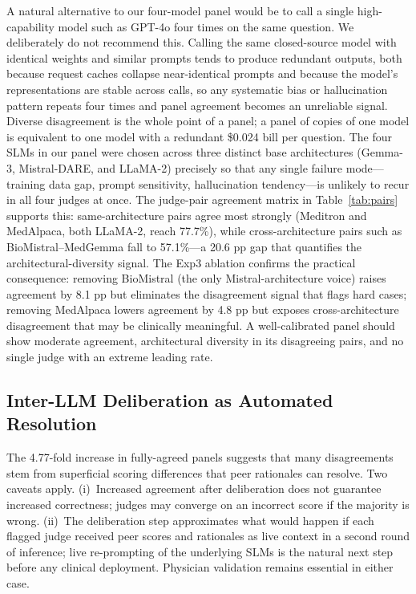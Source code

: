 \documentclass[conference]{IEEEtran}
\begin{document}
A natural alternative to our four-model panel would be to call a
single high-capability model such as GPT-4o four times on the same
question. We deliberately do not recommend this. Calling the same
closed-source model with identical weights and similar prompts tends
to produce redundant outputs, both because request caches collapse
near-identical prompts and because the model's representations are
stable across calls, so any systematic bias or hallucination pattern
repeats four times and panel agreement becomes an unreliable signal.
Diverse disagreement is the whole point of a panel; a panel of
copies of one model is equivalent to one model with a redundant
\$0.024 bill per question. The four SLMs in our panel were chosen
across three distinct base architectures (Gemma-3, Mistral-DARE,
and LLaMA-2) precisely so that any single failure mode---training
data gap, prompt sensitivity, hallucination tendency---is unlikely
to recur in all four judges at once. The judge-pair agreement
matrix in Table~\ref{tab:pairs} supports this: same-architecture
pairs agree most strongly (Meditron and MedAlpaca, both LLaMA-2,
reach 77.7\%), while cross-architecture pairs such as
BioMistral--MedGemma fall to 57.1\%---a 20.6 pp gap that quantifies
the architectural-diversity signal. The Exp3 ablation confirms the
practical consequence: removing BioMistral (the only Mistral-architecture
voice) raises agreement by 8.1 pp but eliminates the disagreement
signal that flags hard cases; removing MedAlpaca lowers agreement by
4.8 pp but exposes cross-architecture disagreement that may be
clinically meaningful. A well-calibrated panel should show moderate
agreement, architectural diversity in its disagreeing pairs, and no
single judge with an extreme leading rate.

\subsection{Inter-LLM Deliberation as Automated Resolution}

The 4.77-fold increase in fully-agreed panels suggests that many
disagreements stem from superficial scoring differences that peer
rationales can resolve. Two caveats apply. (i)~Increased agreement
after deliberation does not guarantee increased correctness; judges
may converge on an incorrect score if the majority is wrong.
(ii)~The deliberation step approximates what would happen if each
flagged judge received peer scores and rationales as live context
in a second round of inference; live re-prompting of the underlying
SLMs is the natural next step before any clinical deployment.
Physician validation remains essential in either case.
\end{document}

